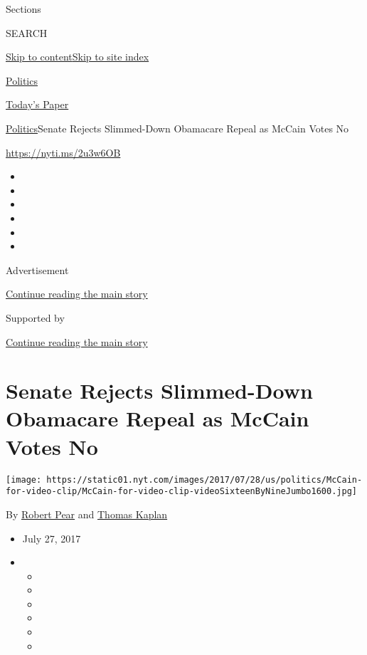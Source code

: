 Sections

SEARCH

\protect\hyperlink{site-content}{Skip to
content}\protect\hyperlink{site-index}{Skip to site index}

\href{https://www.nytimes.com/section/politics}{Politics}

\href{https://myaccount.nytimes.com/auth/login?response_type=cookie\&client_id=vi}{}

\href{https://www.nytimes.com/section/todayspaper}{Today's Paper}

\href{/section/politics}{Politics}\textbar{}Senate Rejects Slimmed-Down
Obamacare Repeal as McCain Votes No

\url{https://nyti.ms/2u3w6OB}

\begin{itemize}
\item
\item
\item
\item
\item
\item
\end{itemize}

Advertisement

\protect\hyperlink{after-top}{Continue reading the main story}

Supported by

\protect\hyperlink{after-sponsor}{Continue reading the main story}

\hypertarget{senate-rejects-slimmed-down-obamacare-repeal-as-mccain-votes-no}{%
\section{Senate Rejects Slimmed-Down Obamacare Repeal as McCain Votes
No}\label{senate-rejects-slimmed-down-obamacare-repeal-as-mccain-votes-no}}

\texttt{[image: https://static01.nyt.com/images/2017/07/28/us/politics/McCain-for-video-clip/McCain-for-video-clip-videoSixteenByNineJumbo1600.jpg]}

By \href{https://www.nytimes.com/by/robert-pear}{Robert Pear} and
\href{http://www.nytimes.com/by/thomas-kaplan}{Thomas Kaplan}

\begin{itemize}
\item
  July 27, 2017
\item
  \begin{itemize}
  \item
  \item
  \item
  \item
  \item
  \item
  \end{itemize}
\end{itemize}

